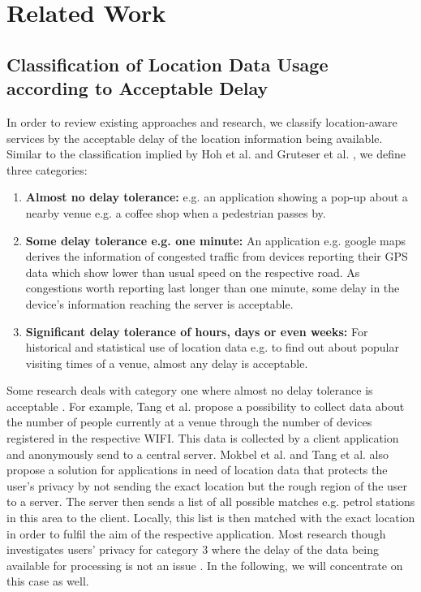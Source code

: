\chapter{Related Work}\label{chapter:related-work}

\section{Classification of Location Data Usage according to Acceptable Delay}
In order to review existing approaches and research, we classify location-aware services by the acceptable delay of the location information being available. Similar to the classification implied by Hoh et al. \parencite{hoh2005protecting} and Gruteser et al. \parencite{gruteser2003anonymous}, we define three categories:
\begin{enumerate}
  \item \textbf{Almost no delay tolerance:} e.g. an application showing a pop-up about a nearby venue e.g. a coffee shop when a pedestrian passes by.
  \item \textbf{Some delay tolerance e.g. one minute:} An application e.g. google maps derives the information of congested traffic from devices reporting their GPS data which show lower than usual speed on the respective road. As congestions worth reporting last longer than one minute, some delay in the device's information reaching the server is acceptable.
  \item \textbf{Significant delay tolerance of hours, days or even weeks:} For historical and statistical use of location data e.g. to find out about popular visiting times of a venue, almost any delay is acceptable.
\end{enumerate}
Some research deals with category one where almost no delay tolerance is acceptable \parencite{location-privacy, mix-zones, tang2006putting}. For example, Tang et al. \parencite{tang2006putting} propose a possibility to collect data about the number of people currently at a venue through the number of devices registered in the respective WIFI. This data is collected by a client application and anonymously send to a central server. Mokbel et al. \parencite{casper} and Tang et al. \parencite{tang2006putting} also propose a solution for applications in need of location data that protects the user's privacy by not sending the exact location but the rough region of the user to a server. The server then sends a list of all possible matches e.g. petrol stations in this area to the client. Locally, this list is then matched with the exact location in order to fulfil the aim of the respective application.
Most research though investigates users' privacy for category 3 where the delay of the data being available for processing is not an issue \parencite{krumm, cellphone, privacy-home-work-pairs, twitter}. In the following, we will concentrate on this case as well.

